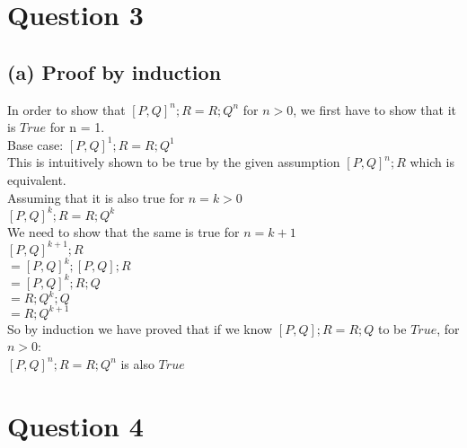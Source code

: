 \documentclass[a4paper,10pt]{article}
\begin{document}
\section*{Question 3}
\subsection*{(a) Proof by induction}
In order to show that $[P,Q]^{n};R = R;Q^n$ for $n>0$, we first have to show that it is $True$ for n = 1.
\\[0.5cm]
Base case: $[P,Q]^{1};R=R;Q^1$
\\[0.5cm]
This is intuitively shown to be true by the given assumption $[P,Q]^{n};R$ which is equivalent.
\\[0.5cm]
Assuming that it is also true for  $n = k > 0$ 
\\[0.5cm]
$[P,Q]^{k};R = R;Q^k$
\\[0.5cm]
We need to show that the same is true for $n = k+1$ 
\\[0.5cm]
$[P,Q]^{k+1};R $
\\[0.25cm]
$= [P,Q]^k;[P,Q];R$
\\[0.25cm]
$= [P,Q]^k;R;Q$
\\[0.25cm]
$= R;Q^k;Q$
\\[0.25cm]
$= R;Q^{k+1}$
\\[0.5cm]
So by induction we have proved that if we know $[P,Q];R = R;Q$ to be $True$, for $n>0$:
\\[0.5cm]
$[P,Q]^{n};R = R;Q^n$
is also $True$

\section*{Question 4}
\end{document}
